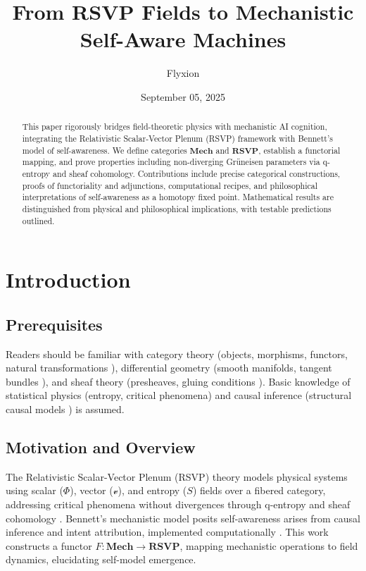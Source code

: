 \documentclass{article}
\title{From RSVP Fields to Mechanistic Self-Aware Machines}
\author{Flyxion}
\date{September 05, 2025}
\begin{document}
\maketitle

\begin{abstract}
This paper rigorously bridges field-theoretic physics with mechanistic AI cognition, integrating the Relativistic Scalar-Vector Plenum (RSVP) framework with Bennett’s model of self-awareness. We define categories $\mathbf{Mech}$ and $\mathbf{RSVP}$, establish a functorial mapping, and prove properties including non-diverging Grüneisen parameters via q-entropy and sheaf cohomology. Contributions include precise categorical constructions, proofs of functoriality and adjunctions, computational recipes, and philosophical interpretations of self-awareness as a homotopy fixed point. Mathematical results are distinguished from physical and philosophical implications, with testable predictions outlined.
\end{abstract}

\section{Introduction}

\subsection{Prerequisites}
Readers should be familiar with category theory (objects, morphisms, functors, natural transformations \cite{Awodey2010}), differential geometry (smooth manifolds, tangent bundles \cite{Kock2004}), and sheaf theory (presheaves, gluing conditions \cite{MacLane1992}). Basic knowledge of statistical physics (entropy, critical phenomena) and causal inference (structural causal models \cite{Pearl2009}) is assumed.

\subsection{Motivation and Overview}
The Relativistic Scalar-Vector Plenum (RSVP) theory models physical systems using scalar ($\Phi$), vector ($\mathcal{v}$), and entropy ($S$) fields over a fibered category, addressing critical phenomena without divergences through q-entropy and sheaf cohomology \cite{Soares2024, Tsallis1988, Soares2023}. Bennett’s mechanistic model posits self-awareness arises from causal inference and intent attribution, implemented computationally \cite{Bennett2025}. This work constructs a functor $F: \mathbf{Mech} \to \mathbf{RSVP}$, mapping mechanistic operations to field dynamics, elucidating self-model emergence.
\end{document}

